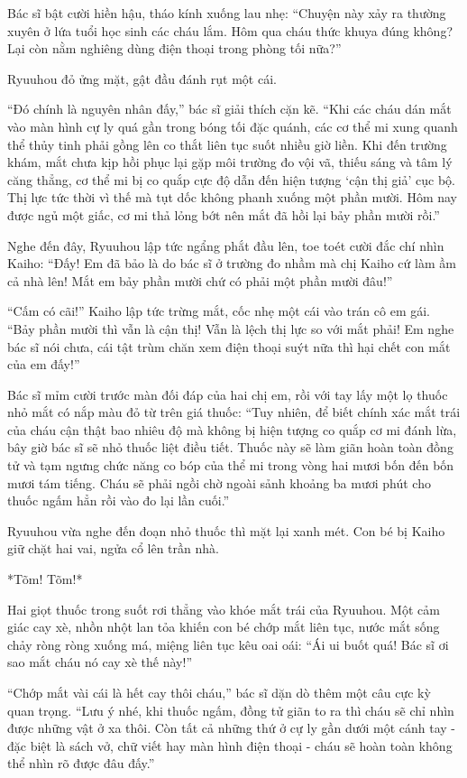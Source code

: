 \documentclass[../main.tex]{subfiles}
\begin{document}
Bác sĩ bật cười hiền hậu, tháo kính xuống lau nhẹ: ``Chuyện này xảy ra thường xuyên ở lứa tuổi học sinh các cháu lắm. Hôm qua cháu thức khuya đúng không? Lại còn nằm nghiêng dùng điện thoại trong phòng tối nữa?''

Ryuuhou đỏ ửng mặt, gật đầu đánh rụt một cái.

``Đó chính là nguyên nhân đấy,'' bác sĩ giải thích cặn kẽ. ``Khi các cháu dán mắt vào màn hình cự ly quá gần trong bóng tối đặc quánh, các cơ thể mi xung quanh thể thủy tinh phải gồng lên co thắt liên tục suốt nhiều giờ liền. Khi đến trường khám, mắt chưa kịp hồi phục lại gặp môi trường đo vội vã, thiếu sáng và tâm lý căng thẳng, cơ thể mi bị co quắp cực độ dẫn đến hiện tượng `cận thị giả' cục bộ. Thị lực tức thời vì thế mà tụt dốc không phanh xuống một phần mười. Hôm nay được ngủ một giấc, cơ mi thả lỏng bớt nên mắt đã hồi lại bảy phần mười rồi.''

Nghe đến đây, Ryuuhou lập tức ngẩng phắt đầu lên, toe toét cười đắc chí nhìn Kaiho: ``Đấy! Em đã bảo là do bác sĩ ở trường đo nhầm mà chị Kaiho cứ làm ầm cả nhà lên! Mắt em bảy phần mười chứ có phải một phần mười đâu!''

``Cấm có cãi!'' Kaiho lập tức trừng mắt, cốc nhẹ một cái vào trán cô em gái. ``Bảy phần mười thì vẫn là cận thị! Vẫn là lệch thị lực so với mắt phải! Em nghe bác sĩ nói chưa, cái tật trùm chăn xem điện thoại suýt nữa thì hại chết con mắt của em đấy!''

Bác sĩ mỉm cười trước màn đối đáp của hai chị em, rồi với tay lấy một lọ thuốc nhỏ mắt có nắp màu đỏ từ trên giá thuốc: ``Tuy nhiên, để biết chính xác mắt trái của cháu cận thật bao nhiêu độ mà không bị hiện tượng co quắp cơ mi đánh lừa, bây giờ bác sĩ sẽ nhỏ thuốc liệt điều tiết. Thuốc này sẽ làm giãn hoàn toàn đồng tử và tạm ngưng chức năng co bóp của thể mi trong vòng hai mươi bốn đến bốn mươi tám tiếng. Cháu sẽ phải ngồi chờ ngoài sảnh khoảng ba mươi phút cho thuốc ngấm hẳn rồi vào đo lại lần cuối.''

Ryuuhou vừa nghe đến đoạn nhỏ thuốc thì mặt lại xanh mét. Con bé bị Kaiho giữ chặt hai vai, ngửa cổ lên trần nhà.

*Tõm! Tõm!*

Hai giọt thuốc trong suốt rơi thẳng vào khóe mắt trái của Ryuuhou. Một cảm giác cay xè, nhồn nhột lan tỏa khiến con bé chớp mắt liên tục, nước mắt sống chảy ròng ròng xuống má, miệng liên tục kêu oai oái: ``Ái ui buốt quá! Bác sĩ ơi sao mắt cháu nó cay xè thế này!''

``Chớp mắt vài cái là hết cay thôi cháu,'' bác sĩ dặn dò thêm một câu cực kỳ quan trọng. ``Lưu ý nhé, khi thuốc ngấm, đồng tử giãn to ra thì cháu sẽ chỉ nhìn được những vật ở xa thôi. Còn tất cả những thứ ở cự ly gần dưới một cánh tay - đặc biệt là sách vở, chữ viết hay màn hình điện thoại - cháu sẽ hoàn toàn không thể nhìn rõ được đâu đấy.''
\end{document}
